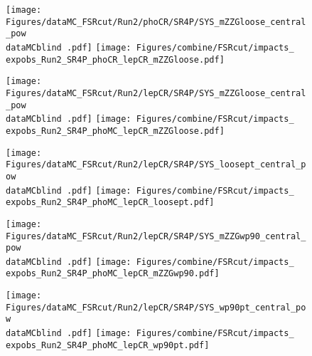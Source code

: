 \label{sec:impacts_FSRcut}

\begin{figure}
  \centering
  \texttt{[image: Figures/dataMC\_FSRcut/Run2/phoCR/SR4P/SYS\_mZZGloose\_central\_pow\\dataMCblind .pdf]}
  \hfill
  \texttt{[image: Figures/combine/FSRcut/impacts\_\\expobs\_Run2\_SR4P\_phoCR\_lepCR\_mZZGloose.pdf]}
  \caption{}
  \label{fig:FSRcut_cutID_phoCR_mZZGloose}
\end{figure}

\begin{figure}
  \centering
  \texttt{[image: Figures/dataMC\_FSRcut/Run2/lepCR/SR4P/SYS\_mZZGloose\_central\_pow\\dataMCblind .pdf]}
  \hfill
  \texttt{[image: Figures/combine/FSRcut/impacts\_\\expobs\_Run2\_SR4P\_phoMC\_lepCR\_mZZGloose.pdf]}
  \caption{}
  \label{fig:FSRcut_cutID_phoMC_mZZGloose}
\end{figure}

\begin{figure}
  \centering
  \texttt{[image: Figures/dataMC\_FSRcut/Run2/lepCR/SR4P/SYS\_loosept\_central\_pow\\dataMCblind .pdf]}
  \hfill
  \texttt{[image: Figures/combine/FSRcut/impacts\_\\expobs\_Run2\_SR4P\_phoMC\_lepCR\_loosept.pdf]}
  \caption{}
  \label{fig:FSRcut_cutID_phoMC_loosept}
\end{figure}

\begin{figure}
  \centering
  \texttt{[image: Figures/dataMC\_FSRcut/Run2/lepCR/SR4P/SYS\_mZZGwp90\_central\_pow\\dataMCblind .pdf]}
  \hfill
  \texttt{[image: Figures/combine/FSRcut/impacts\_\\expobs\_Run2\_SR4P\_phoMC\_lepCR\_mZZGwp90.pdf]}
  \caption{}
  \label{fig:FSRcut_mvaID_phoMC_mZZGwp90}
\end{figure}

\begin{figure}
  \centering
  \texttt{[image: Figures/dataMC\_FSRcut/Run2/lepCR/SR4P/SYS\_wp90pt\_central\_pow\\dataMCblind .pdf]}
  \hfill
  \texttt{[image: Figures/combine/FSRcut/impacts\_\\expobs\_Run2\_SR4P\_phoMC\_lepCR\_wp90pt.pdf]}
  \caption{}
  \label{fig:FSRcut_mvaID_phoMC_wp90pt}
\end{figure}


